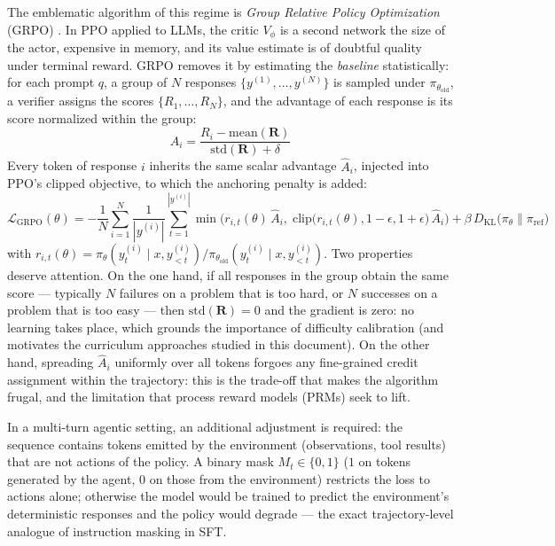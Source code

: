 \documentclass[11pt,a4paper]{article}
\begin{document}
The emblematic algorithm of this regime is \emph{Group Relative Policy Optimization} (GRPO) \cite{shao2024deepseekmath}. In PPO applied to LLMs, the critic $V_\phi$ is a second network the size of the actor, expensive in memory, and its value estimate is of doubtful quality under terminal reward. GRPO removes it by estimating the \emph{baseline} statistically: for each prompt $q$, a group of $N$ responses $\{y^{(1)}, \dots, y^{(N)}\}$ is sampled under $\pi_{\theta_{\text{old}}}$, a verifier assigns the scores $\{R_1, \dots, R_N\}$, and the advantage of each response is its score normalized within the group:
\begin{equation}
\hat{A}_i = \frac{R_i - \text{mean}(\mathbf{R})}{\text{std}(\mathbf{R}) + \delta}
\end{equation}
Every token of response $i$ inherits the same scalar advantage $\hat{A}_i$, injected into PPO's clipped objective, to which the anchoring penalty is added:
\begin{equation}
\mathcal{L}_{\text{GRPO}}(\theta) = -\frac{1}{N} \sum_{i=1}^{N} \frac{1}{|y^{(i)}|} \sum_{t=1}^{|y^{(i)}|} \min\Big( r_{i,t}(\theta)\, \hat{A}_i, \; \text{clip}\big(r_{i,t}(\theta), 1-\epsilon, 1+\epsilon\big)\, \hat{A}_i \Big) + \beta \, D_{\text{KL}}\big( \pi_\theta \parallel \pi_{\text{ref}} \big)
\label{eq:grpo}
\end{equation}
with $r_{i,t}(\theta) = \pi_\theta(y_t^{(i)} \mid x, y_{<t}^{(i)}) / \pi_{\theta_{\text{old}}}(y_t^{(i)} \mid x, y_{<t}^{(i)})$. Two properties deserve attention. On the one hand, if all responses in the group obtain the same score — typically $N$ failures on a problem that is too hard, or $N$ successes on a problem that is too easy — then $\text{std}(\mathbf{R}) = 0$ and the gradient is zero: no learning takes place, which grounds the importance of difficulty calibration (and motivates the curriculum approaches studied in this document). On the other hand, spreading $\hat{A}_i$ uniformly over all tokens forgoes any fine-grained credit assignment within the trajectory: this is the trade-off that makes the algorithm frugal, and the limitation that process reward models (PRMs) seek to lift.

In a multi-turn agentic setting, an additional adjustment is required: the sequence contains tokens emitted by the environment (observations, tool results) that are not actions of the policy. A binary mask $M_t \in \{0,1\}$ ($1$ on tokens generated by the agent, $0$ on those from the environment) restricts the loss to actions alone; otherwise the model would be trained to predict the environment's deterministic responses and the policy would degrade — the exact trajectory-level analogue of instruction masking in SFT.
\end{document}
